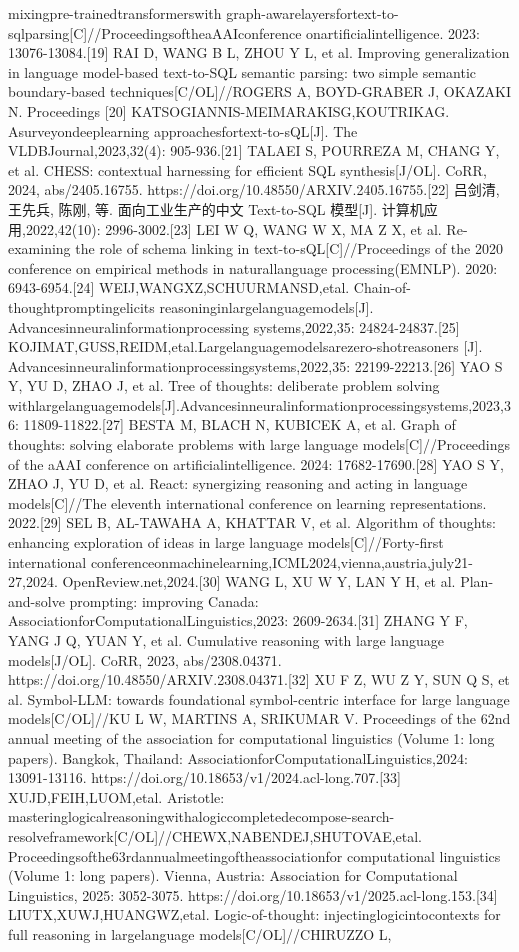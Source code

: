 \documentclass[12pt,a4paper,openright,UTF8]{ctexbook}
\begin{document}
mixingpre-trainedtransformerswith graph-awarelayersfortext-to-sqlparsing[C]//ProceedingsoftheaAAIconference onartificialintelligence. 2023: 13076-13084.[19] RAI D, WANG B L, ZHOU Y L, et al. Improving generalization in language model-based text-to-SQL semantic parsing: two simple semantic boundary-based techniques[C/OL]//ROGERS A, BOYD-GRABER J, OKAZAKI N. Proceedings [20] KATSOGIANNIS-MEIMARAKISG,KOUTRIKAG. Asurveyondeeplearning approachesfortext-to-sQL[J]. The VLDBJournal,2023,32(4): 905-936.[21] TALAEI S, POURREZA M, CHANG Y, et al. CHESS: contextual harnessing for efficient SQL synthesis[J/OL]. CoRR, 2024, abs/2405.16755. https://doi.org/10.48550/ARXIV.2405.16755.[22] 吕剑清, 王先兵, 陈刚, 等. 面向工业生产的中文 Text-to-SQL 模型[J]. 计算机应用,2022,42(10): 2996-3002.[23] LEI W Q, WANG W X, MA Z X, et al. Re-examining the role of schema linking in text-to-sQL[C]//Proceedings of the 2020 conference on empirical methods in naturallanguage processing(EMNLP). 2020: 6943-6954.[24] WEIJ,WANGXZ,SCHUURMANSD,etal. Chain-of-thoughtpromptingelicits reasoninginlargelanguagemodels[J]. Advancesinneuralinformationprocessing systems,2022,35: 24824-24837.[25] KOJIMAT,GUSS,REIDM,etal.Largelanguagemodelsarezero-shotreasoners [J]. Advancesinneuralinformationprocessingsystems,2022,35: 22199-22213.[26] YAO S Y, YU D, ZHAO J, et al. Tree of thoughts: deliberate problem solving withlargelanguagemodels[J].Advancesinneuralinformationprocessingsystems,2023,36: 11809-11822.[27] BESTA M, BLACH N, KUBICEK A, et al. Graph of thoughts: solving elaborate problems with large language models[C]//Proceedings of the aAAI conference on artificialintelligence. 2024: 17682-17690.[28] YAO S Y, ZHAO J, YU D, et al. React: synergizing reasoning and acting in language models[C]//The eleventh international conference on learning representations. 2022.[29] SEL B, AL-TAWAHA A, KHATTAR V, et al. Algorithm of thoughts: enhancing exploration of ideas in large language models[C]//Forty-first international conferenceonmachinelearning,ICML2024,vienna,austria,july21-27,2024. OpenReview.net,2024.[30] WANG L, XU W Y, LAN Y H, et al. Plan-and-solve prompting: improving Canada: AssociationforComputationalLinguistics,2023: 2609-2634.[31] ZHANG Y F, YANG J Q, YUAN Y, et al. Cumulative reasoning with large language models[J/OL]. CoRR, 2023, abs/2308.04371. https://doi.org/10.48550/ARXIV.2308.04371.[32] XU F Z, WU Z Y, SUN Q S, et al. Symbol-LLM: towards foundational symbol-centric interface for large language models[C/OL]//KU L W, MARTINS A, SRIKUMAR V. Proceedings of the 62nd annual meeting of the association for computational linguistics (Volume 1: long papers). Bangkok, Thailand: AssociationforComputationalLinguistics,2024: 13091-13116. https://doi.org/10.18653/v1/2024.acl-long.707.[33] XUJD,FEIH,LUOM,etal. Aristotle: masteringlogicalreasoningwithalogiccompletedecompose-search-resolveframework[C/OL]//CHEWX,NABENDEJ,SHUTOVAE,etal. Proceedingsofthe63rdannualmeetingoftheassociationfor computational linguistics (Volume 1: long papers). Vienna, Austria: Association for Computational Linguistics, 2025: 3052-3075. https://doi.org/10.18653/v1/2025.acl-long.153.[34] LIUTX,XUWJ,HUANGWZ,etal. Logic-of-thought: injectinglogicintocontexts for full reasoning in largelanguage models[C/OL]//CHIRUZZO L, 
\end{document}
